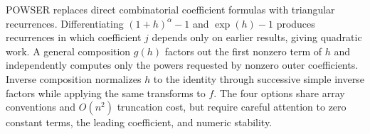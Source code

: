 \documentclass[10pt,letterpaper]{article}
\begin{document}
\begin{tcolorbox}[colback=Ink!4,colframe=Ink,title=Cornell summary]
POWSER replaces direct combinatorial coefficient formulas with triangular recurrences. Differentiating $(1+h)^\alpha-1$ and $\exp(h)-1$ produces recurrences in which coefficient $j$ depends only on earlier results, giving quadratic work. A general composition $g(h)$ factors out the first nonzero term of $h$ and independently computes only the powers requested by nonzero outer coefficients. Inverse composition normalizes $h$ to the identity through successive simple inverse factors while applying the same transforms to $f$. The four options share array conventions and $O(n^2)$ truncation cost, but require careful attention to zero constant terms, the leading coefficient, and numeric stability.
\end{tcolorbox}
\end{document}
